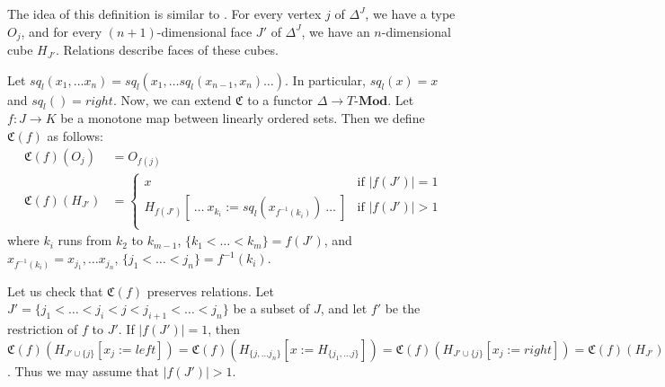 \documentclass[reqno]{amsart}
\theoremstyle{definition}
\theoremstyle{remark}
\newcommand{\repl}{:=}
\newcommand{\cat}[1]{\mathbf{#1}}
\newcommand{\Mod}[1]{#1\text{-}\cat{Mod}}
\newcommand{\M}{H}
\numberwithin{figure}{section}
\begin{document}
The idea of this definition is similar to \cite[Definition~1.1.5.1]{lurie-topos}.
For every vertex $j$ of $\Delta^J$, we have a type $O_j$,
and for every $(n+1)$-dimensional face $J'$ of $\Delta^J$, we have an $n$-dimensional cube $\M_{J'}$.
Relations describe faces of these cubes.

Let $sq_l(x_1, \ldots x_n) = sq_l(x_1, \ldots sq_l(x_{n-1},x_n) \ldots )$.
In particular, $sq_l(x) = x$ and $sq_l() = right$.
Now, we can extend $\mathfrak{C}$ to a functor $\Delta \to \Mod{T}$.
Let $f : J \to K$ be a monotone map between linearly ordered sets.
Then we define $\mathfrak{C}(f)$ as follows:
\begin{align*}
\mathfrak{C}(f)(O_j) & = O_{f(j)} \\
\mathfrak{C}(f)(\M_{J'}) & =
\begin{cases}
    x                                                                  & \text{if } |f(J')| = 1 \\
    \M_{f(J')}[\ \ldots\ x_{k_i} \repl sq_l(x_{f^{-1}(k_i)})\ \ldots\ ] & \text{if } |f(J')| > 1 \\
\end{cases}
\end{align*}
where $k_i$ runs from $k_2$ to $k_{m-1}$, $\{ k_1 < \ldots < k_m \} = f(J')$,
and $x_{f^{-1}(k_i)} = x_{j_1}, \ldots x_{j_n}$, $\{ j_1 < \ldots < j_n \} = f^{-1}(k_i)$.

Let us check that $\mathfrak{C}(f)$ preserves relations.
Let $J' = \{ j_1 < \ldots < j_i < j < j_{i+1} < \ldots < j_n \}$ be a subset of $J$, and let $f'$ be the restriction of $f$ to $J'$.
If $|f(J')| = 1$, then $\mathfrak{C}(f)(\M_{J' \cup \{j\}}[x_j \repl left]) = \mathfrak{C}(f)(\M_{\{ j, \ldots j_n \}}[x \repl \M_{\{ j_1, \ldots j \}}]) = \mathfrak{C}(f)(\M_{J' \cup \{j\}}[x_j \repl right]) = \mathfrak{C}(f)(\M_{J'}) = x$.
Thus we may assume that $|f(J')| > 1$. 
\end{document}
